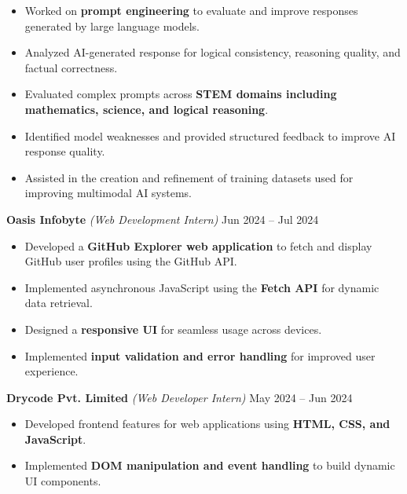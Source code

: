 \documentclass[a4paper,10.9pt]{article}
\begin{document}
\begin{itemize}

\item Worked on \textbf{prompt engineering} to evaluate and improve responses generated by large language models.

\item Analyzed AI-generated response for logical consistency, reasoning quality, and factual correctness.

\item Evaluated complex prompts across \textbf{STEM domains including mathematics, science, and logical reasoning}.

\item Identified model weaknesses and provided structured feedback to improve AI response quality.

\item Assisted in the creation and refinement of training datasets used for improving multimodal AI systems.

\end{itemize}

\vspace{3pt}

{\large\textbf{\color{hdrblue}Oasis Infobyte}}
\textit{(Web Development Intern)} \hfill Jun 2024 -- Jul 2024

\begin{itemize}

\item Developed a \textbf{GitHub Explorer web application} to fetch and display GitHub user profiles using the GitHub API.

\item Implemented asynchronous JavaScript using the \textbf{Fetch API} for dynamic data retrieval.

\item Designed a \textbf{responsive UI} for seamless usage across devices.

\item Implemented \textbf{input validation and error handling} for improved user experience.

\end{itemize}

\vspace{3pt}

{\large\textbf{\color{hdrblue}Drycode Pvt. Limited}}
\textit{(Web Developer Intern)} \hfill May 2024 -- Jun 2024

\begin{itemize}

\item Developed frontend features for web applications using \textbf{HTML, CSS, and JavaScript}.

\item Implemented \textbf{DOM manipulation and event handling} to build dynamic UI components.

\end{itemize}
\end{document}
